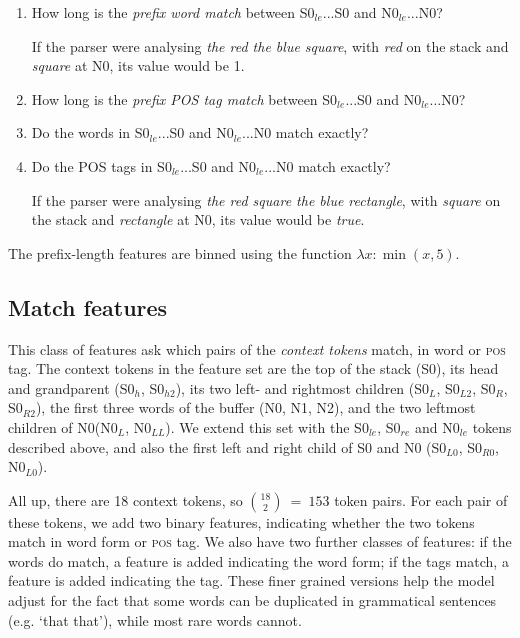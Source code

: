 \documentclass[11pt,letterpaper]{article}
\newcommand{\pos}{\textsc{pos}\xspace}
\newcommand{\szero}{S0\xspace}
\newcommand{\nzero}{N0\xspace}
\newcommand{\szeroH}{S0$_h$\xspace}
\newcommand{\szeroHH}{S0$_{h2}$\xspace}
\newcommand{\szeroL}{S0$_L$\xspace}
\newcommand{\szeroLL}{S0$_{L2}$\xspace}
\newcommand{\szeroR}{S0$_R$\xspace}
\newcommand{\szeroRR}{S0$_{R2}$\xspace}
\newcommand{\szeroLzero}{S0$_{L0}$\xspace}
\newcommand{\szeroRzero}{S0$_{R0}$\xspace}
\newcommand{\nzeroL}{N0$_L$\xspace}
\newcommand{\nzeroLL}{N0$_{LL}$\xspace}
\newcommand{\nzeroLzero}{N0$_{L0}$\xspace}
\newcommand{\szeroRedge}{S0$_{re}$\xspace}
\newcommand{\szeroLedge}{S0$_{le}$\xspace}
\newcommand{\nzeroLedge}{N0$_{le}$\xspace}
\begin{document}
\begin{enumerate}
    \itemsep0em
    \item How long is the \emph{prefix word match} between \szeroLedge...\szero
        and \nzeroLedge...\nzero? \par
        If the parser were analysing \emph{the red the blue square},
        with \emph{red} on the stack and \emph{square} at \nzero, its value would be 1.
    \item How long is the \emph{prefix POS tag match} between \szeroLedge...\szero
          and \nzeroLedge...\nzero?
    \item Do the words in \szeroLedge...\szero and \nzeroLedge...\nzero match
        exactly? 
    \item Do the POS tags in \szeroLedge...\szero and \nzeroLedge...\nzero match
        exactly?
        \par If the parser were analysing \emph{the red square the blue rectangle},
        with \emph{square} on the stack and \emph{rectangle} at \nzero, its
        value would be \emph{true}.
\end{enumerate}

\noindent The prefix-length features are binned using the function $\lambda x: \min(x, 5)$.

\subsection{Match features}

This class of features ask which pairs of the \emph{context tokens} match, in
word or \pos tag.  The context tokens in the \citet{zhang:11} feature set
are the top of the stack (\szero), its head and grandparent (\szeroH, \szeroHH),
its two left- and rightmost children (\szeroL, \szeroLL, \szeroR, \szeroRR), the
first three words of the buffer (\nzero, N1, N2), and the two leftmost children
of \nzero (\nzeroL, \nzeroLL).
We extend this set with the \szeroLedge, \szeroRedge and \nzeroLedge tokens
described above, and also the first left and right child of \szero and \nzero
(\szeroLzero, \szeroRzero, \nzeroLzero).

All up, there are 18 context tokens, so ${18 \choose 2}~=~153$ token pairs.
For each pair of these tokens, we add two binary features, indicating whether the
two tokens match in word form or \pos tag.  We also have two further classes of
features: if the words do match, a feature is added indicating the word form;
if the tags match, a feature is added indicating the tag. These finer grained
versions help the model adjust for the fact that some words can be duplicated
in grammatical sentences (e.g. `that that'), while most rare words cannot.
\end{document}
